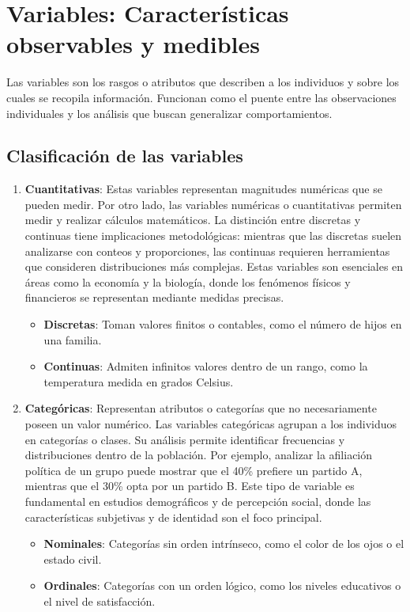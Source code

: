 \documentclass[
  letterpaper,
  DIV=11,
  numbers=noendperiod]{scrreprt}
\providecommand{\tightlist}{%
  \setlength{\itemsep}{0pt}\setlength{\parskip}{0pt}}\usepackage{longtable,booktabs,array}
\begin{document}
\section{Variables: Características observables y
medibles}\label{variables-caracteruxedsticas-observables-y-medibles}

Las variables son los rasgos o atributos que describen a los individuos
y sobre los cuales se recopila información. Funcionan como el puente
entre las observaciones individuales y los análisis que buscan
generalizar comportamientos.

\subsection{Clasificación de las
variables}\label{clasificaciuxf3n-de-las-variables}

\begin{enumerate}
\def\labelenumi{\arabic{enumi}.}
\item
  \textbf{Cuantitativas}: Estas variables representan magnitudes
  numéricas que se pueden medir. Por otro lado, las variables numéricas
  o cuantitativas permiten medir y realizar cálculos matemáticos. La
  distinción entre discretas y continuas tiene implicaciones
  metodológicas: mientras que las discretas suelen analizarse con
  conteos y proporciones, las continuas requieren herramientas que
  consideren distribuciones más complejas. Estas variables son
  esenciales en áreas como la economía y la biología, donde los
  fenómenos físicos y financieros se representan mediante medidas
  precisas.

  \begin{itemize}
  \item
    \textbf{Discretas}: Toman valores finitos o contables, como el
    número de hijos en una familia.
  \item
    \textbf{Continuas}: Admiten infinitos valores dentro de un rango,
    como la temperatura medida en grados Celsius.
  \end{itemize}
\item
  \textbf{Categóricas}: Representan atributos o categorías que no
  necesariamente poseen un valor numérico. Las variables categóricas
  agrupan a los individuos en categorías o clases. Su análisis permite
  identificar frecuencias y distribuciones dentro de la población. Por
  ejemplo, analizar la afiliación política de un grupo puede mostrar que
  el 40\% prefiere un partido A, mientras que el 30\% opta por un
  partido B. Este tipo de variable es fundamental en estudios
  demográficos y de percepción social, donde las características
  subjetivas y de identidad son el foco principal.

  \begin{itemize}
  \tightlist
  \item
    \textbf{Nominales}: Categorías sin orden intrínseco, como el color
    de los ojos o el estado civil.\\
  \item
    \textbf{Ordinales}: Categorías con un orden lógico, como los niveles
    educativos o el nivel de satisfacción.
  \end{itemize}
\end{enumerate}
\end{document}
